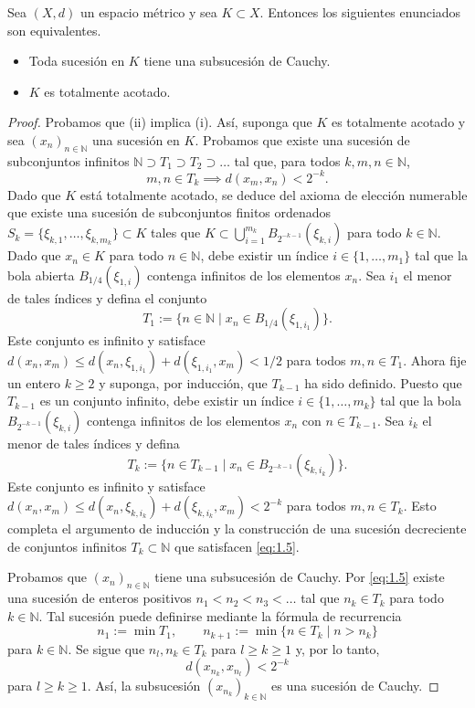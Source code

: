 \begin{lemma} \label{lem:1.5}
Sea $(X, d)$ un espacio métrico y sea $K\subset X$. Entonces los siguientes enunciados son equivalentes.
\begin{itemize}
    \item[(i)] Toda sucesión en $K$ tiene una subsucesión de Cauchy.
    \item[(ii)] $K$ es totalmente acotado.
\end{itemize}
\end{lemma}
\begin{proof}
Probamos que (ii) implica (i). Así, suponga que $K$ es totalmente acotado y sea $(x_{n})_{n\in\mathbb{N}}$ una sucesión en $K$. Probamos que existe una sucesión de subconjuntos infinitos $\mathbb{N}\supset T_{1}\supset T_{2}\supset\dots$ tal que, para todos $k, m, n\in\mathbb{N}$,
\begin{equation}\label{eq:1.5}
m, n \in T_k \implies d(x_{m},x_{n})<2^{-k}.
\end{equation}
Dado que $K$ está totalmente acotado, se deduce del axioma de elección numerable que existe una sucesión de subconjuntos finitos ordenados $S_{k}=\{\xi_{k,1},\dots,\xi_{k,m_{k}}\}\subset K$ tales que $K\subset\bigcup_{i=1}^{m_{k}}B_{2^{-k-1}}(\xi_{k,i})$ para todo $k\in\mathbb{N}$. Dado que $x_{n}\in K$ para todo $n\in\mathbb{N}$, debe existir un índice $i\in\{1,\dots,m_{1}\}$ tal que la bola abierta $B_{1/4}(\xi_{1,i})$ contenga infinitos de los elementos $x_{n}$. Sea $i_{1}$ el menor de tales índices y defina el conjunto
\[ T_{1} := \{n\in\mathbb{N} \mid x_{n}\in B_{1/4}(\xi_{1,i_{1}})\}. \]
Este conjunto es infinito y satisface $d(x_{n},x_{m})\le d(x_{n},\xi_{1,i_{1}})+d(\xi_{1,i_{1}},x_{m})<1/2$ para todos $m,n\in T_{1}$. Ahora fije un entero $k\ge 2$ y suponga, por inducción, que $T_{k-1}$ ha sido definido. Puesto que $T_{k-1}$ es un conjunto infinito, debe existir un índice $i\in\{1,\dots,m_{k}\}$ tal que la bola $B_{2^{-k-1}}(\xi_{k,i})$ contenga infinitos de los elementos $x_{n}$ con $n\in T_{k-1}$. Sea $i_{k}$ el menor de tales índices y defina
\[ T_{k} := \{n\in T_{k-1} \mid x_{n}\in B_{2^{-k-1}}(\xi_{k,i_{k}})\}. \]
Este conjunto es infinito y satisface $d(x_{n},x_{m})\le d(x_{n},\xi_{k,i_{k}})+d(\xi_{k,i_{k}},x_{m})<2^{-k}$ para todos $m,n\in T_{k}$. Esto completa el argumento de inducción y la construcción de una sucesión decreciente de conjuntos infinitos $T_{k}\subset\mathbb{N}$ que satisfacen \eqref{eq:1.5}.

Probamos que $(x_{n})_{n\in\mathbb{N}}$ tiene una subsucesión de Cauchy. Por \eqref{eq:1.5} existe una sucesión de enteros positivos $n_{1}<n_{2}<n_{3}<\dots$ tal que $n_{k}\in T_{k}$ para todo $k\in\mathbb{N}$. Tal sucesión puede definirse mediante la fórmula de recurrencia
\[ n_{1} := \min T_{1}, \qquad n_{k+1} := \min\{n\in T_{k} \mid n>n_{k}\} \]
para $k\in\mathbb{N}$. Se sigue que $n_{l}, n_{k} \in T_k$ para $l \ge k \ge 1$ y, por lo tanto,
\[ d(x_{n_{k}},x_{n_{l}})<2^{-k} \]
para $l\ge k\ge 1$. Así, la subsucesión $(x_{n_{k}})_{k\in\mathbb{N}}$ es una sucesión de Cauchy.


\end{proof}
